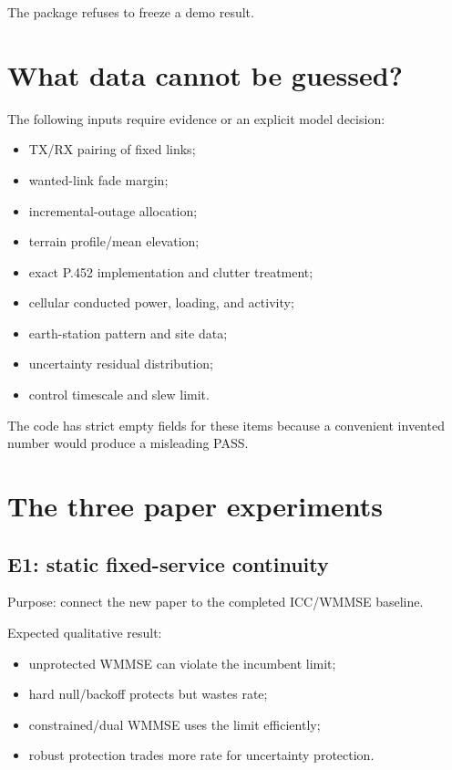 \documentclass[11pt]{article}
\begin{document}
The package refuses to freeze a demo result.

\section{What data cannot be guessed?}

The following inputs require evidence or an explicit model decision:

\begin{itemize}
\item TX/RX pairing of fixed links;
\item wanted-link fade margin;
\item incremental-outage allocation;
\item terrain profile/mean elevation;
\item exact P.452 implementation and clutter treatment;
\item cellular conducted power, loading, and activity;
\item earth-station pattern and site data;
\item uncertainty residual distribution;
\item control timescale and slew limit.
\end{itemize}

The code has strict empty fields for these items because a convenient invented number would produce a misleading PASS.

\section{The three paper experiments}

\subsection{E1: static fixed-service continuity}

Purpose: connect the new paper to the completed ICC/WMMSE baseline.

Expected qualitative result:

\begin{itemize}
\item unprotected WMMSE can violate the incumbent limit;
\item hard null/backoff protects but wastes rate;
\item constrained/dual WMMSE uses the limit efficiently;
\item robust protection trades more rate for uncertainty protection.
\end{itemize}
\end{document}
